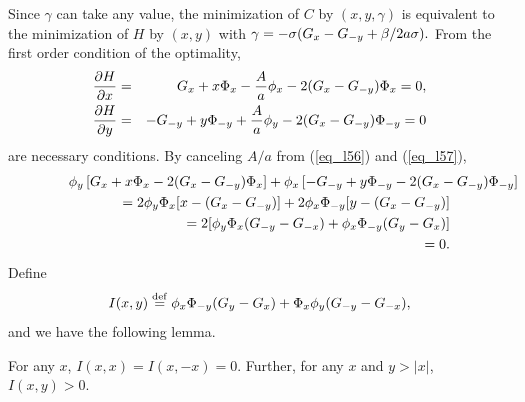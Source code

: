 Since $\gamma$ can take any value, the minimization of $C$ by $(x, y, \gamma)$ is equivalent to the minimization of $H$ by $(x, y)$ with $\gamma = - \sigma ( G_x - G_{-y} + \beta/2a\sigma ).$  From the first order condition of the optimality,
\begin{eqnarray}
  \frac{\partial H}{\partial x}
   & = & G_x + x \Phi_x - \frac{A}{a} \phi_x - 2 ( G_x - G_{-y} ) \Phi_x = 0, \label{eq_l56} \\
  \frac{\partial H}{\partial y}
   & = & - G_{-y} + y \Phi_{-y} + \frac{A}{a} \phi_y - 2 ( G_x - G_{-y} ) \Phi_{-y} = 0 \label{eq_l57}
\end{eqnarray}
are necessary conditions.  By canceling $A/a$ from (\ref{eq_l56}) and (\ref{eq_l57}),
\begin{eqnarray*}
  \lefteqn{\py \left[ \gx + x \Px - 2 ( \gx - \gmy ) \Px \right]
    + \px \left[ - \gmy + y \Pmy - 2 ( \gx - \gmy ) \Pmy \right]} \nonumber \\
  & & \hspace{1.0cm} = 2 \py \Px [ x - ( \gx - \gmy )] + 2 \px \Pmy [ y - ( \gx - \gmy )] \nonumber \\
  & & \hspace{1.0cm} = 2 [ \py \Px ( \gmy - \gmx ) + \px \Pmy ( \gy - \gx ) ] \nonumber \\
  & & \hspace{1.0cm} = 0. \label{eq_l58}
\end{eqnarray*}
Define
\[ %
  I(x,y) \define \px \Pmy (\gy - \gx) + \Px \py (\gmy - \gmx),
\] %
and we have the following lemma.
\begin{lemma}\label{lem_l6}
 \quad For any $x$, $I(x,x)=I(x,-x)=0$.  Further, for any $x$ and $y > |x|$, $I(x,y)>0$.
\end{lemma}


